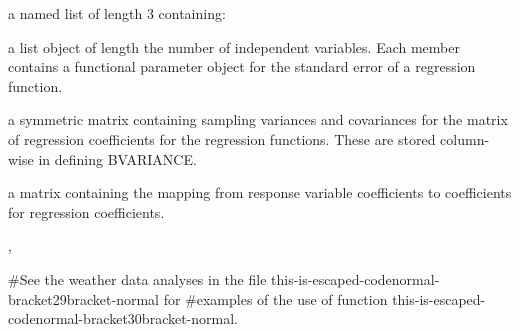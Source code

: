 \documentclass{article}
\begin{document}
\begin{Value}
a named list of length 3 containing:

\begin{ldescription}
\item[\code{betastderrlist}] a list object of length
the number of independent variables. Each member contains a
functional parameter object
for the standard error of a regression function.

\item[\code{bvar}] a symmetric matrix containing sampling variances and
covariances for the matrix of regression coefficients
for the regression functions.  These are stored
column-wise in defining BVARIANCE.

\item[\code{c2bMap}] a matrix containing the mapping from response variable
coefficients to coefficients for regression coefficients.

\end{ldescription}
\end{Value}
\begin{SeeAlso}\relax
{}, 
\end{SeeAlso}
\begin{Examples}
\begin{ExampleCode}
#See the weather data analyses in the file this-is-escaped-codenormal-bracket29bracket-normal for
#examples of the use of function this-is-escaped-codenormal-bracket30bracket-normal.
\end{ExampleCode}
\end{Examples}
\end{document}
